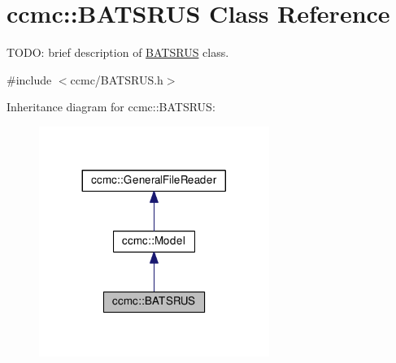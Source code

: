 \hypertarget{classccmc_1_1_b_a_t_s_r_u_s}{\section{ccmc\-:\-:B\-A\-T\-S\-R\-U\-S Class Reference}
\label{classccmc_1_1_b_a_t_s_r_u_s}
}


T\-O\-D\-O\-: brief description of \hyperlink{classccmc_1_1_b_a_t_s_r_u_s}{B\-A\-T\-S\-R\-U\-S} class.  




{\ttfamily \#include $<$ccmc/\-B\-A\-T\-S\-R\-U\-S.\-h$>$}



Inheritance diagram for ccmc\-:\-:B\-A\-T\-S\-R\-U\-S\-:
\nopagebreak
\begin{figure}[H]
\begin{center}
\leavevmode
\includegraphics[width=212pt]{classccmc_1_1_b_a_t_s_r_u_s__inherit__graph}
\end{center}
\end{figure}


